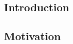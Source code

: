\documentclass[12pt, a4paper]{article}
\begin{document}
\begin{enumerate}
\newpage
\section*{Introduction}

\subsection*{Motivation}
%
%	
%	
%
%	
%	
%		
%	


\end{enumerate}
\end{document}

